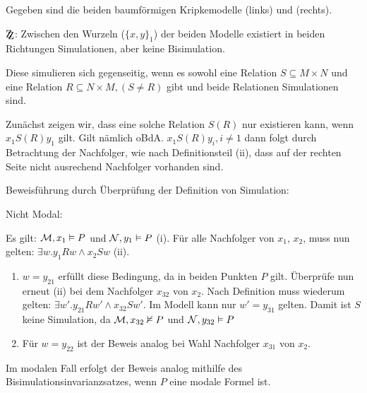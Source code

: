 \begin{center}
\begin{minipage}{0.4\textwidth}
\end{minipage}
\end{center}

Gegeben sind die beiden baumförmigen Kripkemodelle  (links) und
 (rechts).

$\mathrm{Z\kern-0.4em\raise-0.4ex\hbox{Z}}$: Zwischen den Wurzeln ($\{x,y\}_1$)
der beiden Modelle existiert in beiden Richtungen Simulationen, aber keine
Bisimulation.

Diese simulieren sich gegenseitig, wenn es sowohl eine Relation $S \subseteq M \times
N$ und eine Relation $R \subseteq N \times M, (S \neq R)$ gibt und beide Relationen
Simulationen sind.

Zunächst zeigen wir, dass eine solche Relation $S(R)$ nur existieren kann, wenn
$x_1 S(R) y_1$ gilt. Gilt nämlich oBdA. $x_1 S(R) y_i, i \neq 1$ dann folgt durch
Betrachtung der Nachfolger, wie nach Definitionsteil (ii), dass auf der rechten
Seite nicht ausrechend Nachfolger vorhanden sind.

Beweisführung durch Überprüfung der Definition von Simulation:

Nicht Modal:

Es gilt: $\mathcal{M}, x_1 \vDash P$ und $\mathcal{N},y_1 \vDash P$ (i). Für alle
Nachfolger von $x_1$, $x_2$, muss nun gelten: $\exists w.y_1 R w \wedge x_2 S w$
(ii).
\begin{enumerate}
	\item $w = y_{21}$ erfüllt diese Bedingung, da in beiden Punkten $P$ gilt.
		Überprüfe nun erneut (ii) bei dem Nachfolger $x_{32}$ von $x_2$. Nach
		Definition muss wiederum gelten: $\exists w'.y_{21} R w' \wedge x_{32} S
		w'$. Im Modell  kann nur $w' = y_{31}$ gelten. Damit ist $S$
		keine Simulation, da $\mathcal{M}, x_{32} \nvDash P$ und $\mathcal{N},
		y_{32} \vDash P$
	\item Für $w = y_{22}$ ist der Beweis analog bei Wahl Nachfolger $x_{31}$
		von $x_2$.
\end{enumerate}

Im modalen Fall erfolgt der Beweis analog mithilfe des
Bisimulationsinvarianzsatzes, wenn $P$ eine modale Formel ist.

